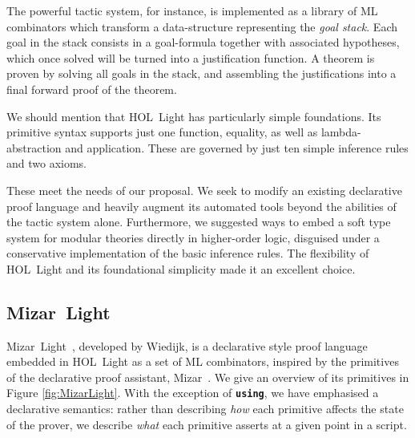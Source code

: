 The powerful tactic system, for instance, is implemented as a library of ML combinators which transform a data-structure representing the \emph{goal stack}. Each goal in the stack consists in a goal-formula together with associated hypotheses, which once solved will be turned into a justification function. A theorem is proven by solving all goals in the stack, and assembling the justifications into a final forward proof of the theorem.

We should mention that HOL~Light has particularly simple foundations. Its primitive syntax supports just one function, equality, as well as lambda-abstraction and application. These are governed by just ten simple inference rules and two axioms.

These meet the needs of our proposal. We seek to modify an existing declarative proof language and heavily augment its automated tools beyond the abilities of the tactic system alone. Furthermore, we suggested ways to embed a soft type system for modular theories directly in higher-order logic, disguised under a conservative implementation of the basic inference rules. The flexibility of HOL~Light and its foundational simplicity made it an excellent choice.

\subsection{Mizar~Light}\label{sec:MizarLight}
Mizar~Light~\cite{MizarLight}, developed by Wiedijk, is a declarative style proof language embedded in HOL~Light as a set of ML combinators, inspired by the primitives of the declarative proof assistant, Mizar~\cite{MizarMathematicalVernacular}. We give an overview of its primitives in Figure \ref{fig:MizarLight}. With the exception of \texttt{\bfseries using}, we have emphasised a declarative semantics: rather than describing \emph{how} each primitive affects the state of the prover, we describe \emph{what} each primitive asserts at a given point in a script.

